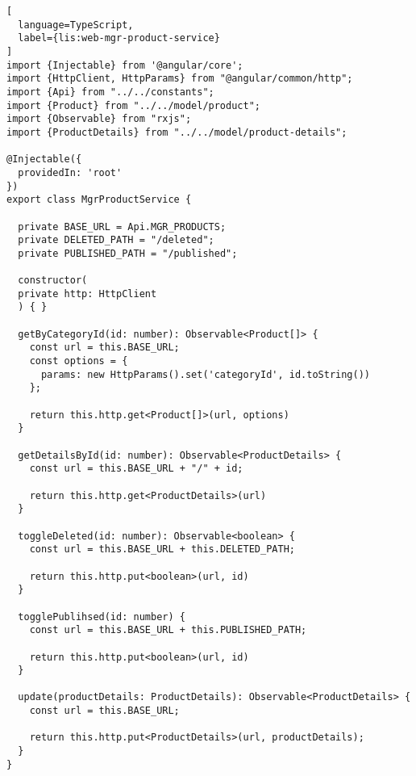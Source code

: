 \begin{lstlisting}[
  language=TypeScript,
  label={lis:web-mgr-product-service}
]
import {Injectable} from '@angular/core';
import {HttpClient, HttpParams} from "@angular/common/http";
import {Api} from "../../constants";
import {Product} from "../../model/product";
import {Observable} from "rxjs";
import {ProductDetails} from "../../model/product-details";

@Injectable({
  providedIn: 'root'
})
export class MgrProductService {

  private BASE_URL = Api.MGR_PRODUCTS;
  private DELETED_PATH = "/deleted";
  private PUBLISHED_PATH = "/published";

  constructor(
  private http: HttpClient
  ) { }

  getByCategoryId(id: number): Observable<Product[]> {
    const url = this.BASE_URL;
    const options = {
      params: new HttpParams().set('categoryId', id.toString())
    };

    return this.http.get<Product[]>(url, options)
  }

  getDetailsById(id: number): Observable<ProductDetails> {
    const url = this.BASE_URL + "/" + id;

    return this.http.get<ProductDetails>(url)
  }

  toggleDeleted(id: number): Observable<boolean> {
    const url = this.BASE_URL + this.DELETED_PATH;

    return this.http.put<boolean>(url, id)
  }

  togglePublihsed(id: number) {
    const url = this.BASE_URL + this.PUBLISHED_PATH;

    return this.http.put<boolean>(url, id)
  }

  update(productDetails: ProductDetails): Observable<ProductDetails> {
    const url = this.BASE_URL;

    return this.http.put<ProductDetails>(url, productDetails);
  }
}

\end{lstlisting}